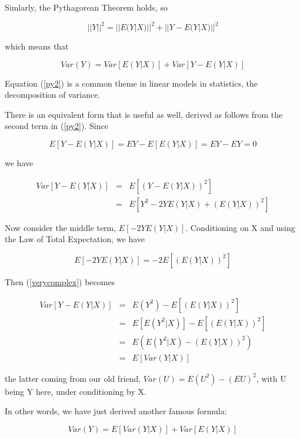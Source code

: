 Simlarly, the Pythagorean Theorem holds, so

\begin{equation}
\label{py}
{||Y||}^2 = {||E(Y|X)||}^2 + {||Y-E(Y|X)||}^2
\end{equation}

which means that

\begin{equation}
\label{py2}
Var(Y) = Var[E(Y|X)] + Var[Y-E(Y|X)]
\end{equation}

Equation (\ref{py2}) is a common theme in linear models in statistics,
the decomposition of variance.  

There is an equivalent form that is useful as well, derived as follows
from the second term in (\ref{py2}).  Since

\begin{equation}
E[Y-E(Y|X)] = EY - E[E(Y|X)] = EY - EY = 0
\end{equation}

we have

\begin{eqnarray}
\label{verycomplex}
Var[Y-E(Y|X)] &=& E \left [ (Y-E(Y|X))^2 \right ] \\ 
&=& E \left [ Y^2 -2YE(Y|X) + (E(Y|X))^2 \right ] 
\end{eqnarray}

Now consider the middle term, $E[-2YE(Y|X)]$.  Conditioning on X and
using the Law of Total Expectation, we have

\begin{equation}
E[-2YE(Y|X)] = -2 E \left [ (E(Y|X))^2 \right ]
\end{equation}

Then (\ref{verycomplex}) becomes

\begin{eqnarray}
Var[Y-E(Y|X)] &=& E (Y^2) - E \left [ (E(Y|X))^2 \right ] \\
&=& E \left [ E(Y^2 | X) \right ] - E \left [ (E(Y|X))^2 \right ] \\
&=& E \left ( E(Y^2 | X) - (E(Y|X))^2 \right ) \\
&=& E \left [ Var(Y|X) \right ]
\end{eqnarray}

the latter coming from our old friend, $Var(U) = E(U^2) - (EU)^2$, with
U being Y here, under conditioning by X.

In other words, we have just derived another famous formula:

\begin{equation}
Var(Y) = E[Var(Y|X)] + Var[E(Y|X)]
\end{equation}

